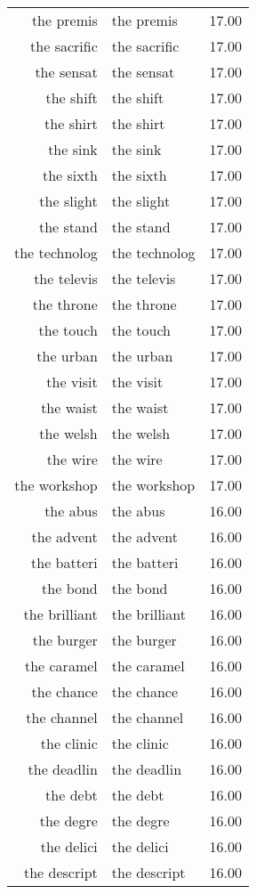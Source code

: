 \begin{table}[ht]
\begin{tabular}{rlr}
  the premis & the premis & 17.00 \\ 
  the sacrific & the sacrific & 17.00 \\ 
  the sensat & the sensat & 17.00 \\ 
  the shift & the shift & 17.00 \\ 
  the shirt & the shirt & 17.00 \\ 
  the sink & the sink & 17.00 \\ 
  the sixth & the sixth & 17.00 \\ 
  the slight & the slight & 17.00 \\ 
  the stand & the stand & 17.00 \\ 
  the technolog & the technolog & 17.00 \\ 
  the televis & the televis & 17.00 \\ 
  the throne & the throne & 17.00 \\ 
  the touch & the touch & 17.00 \\ 
  the urban & the urban & 17.00 \\ 
  the visit & the visit & 17.00 \\ 
  the waist & the waist & 17.00 \\ 
  the welsh & the welsh & 17.00 \\ 
  the wire & the wire & 17.00 \\ 
  the workshop & the workshop & 17.00 \\ 
  the abus & the abus & 16.00 \\ 
  the advent & the advent & 16.00 \\ 
  the batteri & the batteri & 16.00 \\ 
  the bond & the bond & 16.00 \\ 
  the brilliant & the brilliant & 16.00 \\ 
  the burger & the burger & 16.00 \\ 
  the caramel & the caramel & 16.00 \\ 
  the chance & the chance & 16.00 \\ 
  the channel & the channel & 16.00 \\ 
  the clinic & the clinic & 16.00 \\ 
  the deadlin & the deadlin & 16.00 \\ 
  the debt & the debt & 16.00 \\ 
  the degre & the degre & 16.00 \\ 
  the delici & the delici & 16.00 \\ 
  the descript & the descript & 16.00 \\ 

\end{tabular}
\end{table}
